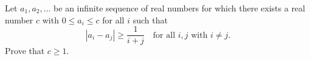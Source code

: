 Let $a_1, a_2, \ldots$ be an infinite sequence of real numbers for which there exists a real number $c$ with $0 \leq a_i \leq c$ for all $i$ such that
\[ |a_i - a_j| \geq \frac{1}{i+j} \quad \text{for all } i, j \text{ with } i \neq j. \]
Prove that $c \geq 1$.
